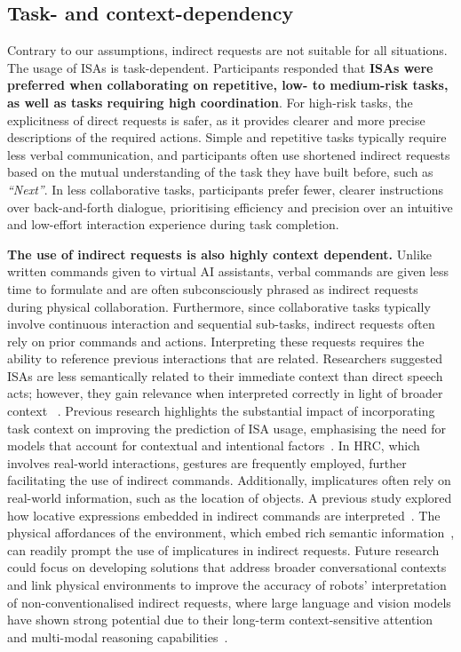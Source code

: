 \subsection{Task- and context-dependency}
Contrary to our assumptions, indirect requests are not suitable for all situations. The usage of ISAs is task-dependent. Participants responded that \textbf{ISAs were preferred when collaborating on repetitive, low- to medium-risk tasks, as well as tasks requiring high coordination}. For high-risk tasks, the explicitness of direct requests is safer, as it provides clearer and more precise descriptions of the required actions. Simple and repetitive tasks typically require less verbal communication, and participants often use shortened indirect requests based on the mutual understanding of the task they have built before, such as \textit{``Next''}. In less collaborative tasks, participants prefer fewer, clearer instructions over back-and-forth dialogue, prioritising efficiency and precision over an intuitive and low-effort interaction experience during task completion.

\textbf{The use of indirect requests is also highly context dependent.} Unlike written commands given to virtual AI assistants, verbal commands are given less time to formulate and are often subconsciously phrased as indirect requests during physical collaboration. Furthermore, since collaborative tasks typically involve continuous interaction and sequential sub-tasks, indirect requests often rely on prior commands and actions. Interpreting these requests requires the ability to reference previous interactions that are related. Researchers suggested ISAs are less semantically related to their immediate context than direct speech acts; however, they gain relevance when interpreted correctly in light of broader context ~\cite{boux2023cognitive}. Previous research highlights the substantial impact of incorporating task context on improving the prediction of ISA usage, emphasising the need for models that account for contextual and intentional factors~\cite{smith2022leveraging}. In HRC, which involves real-world interactions, gestures are frequently employed, further facilitating the use of indirect commands. Additionally, implicatures often rely on real-world information, such as the location of objects. A previous study explored how locative expressions embedded in indirect commands are interpreted~\cite{lamm2017pragmatics}. The physical affordances of the environment, which embed rich semantic information~\cite{gao2024physically, brohan2023can}, can readily prompt the use of implicatures in indirect requests. Future research could focus on developing solutions that address broader conversational contexts and link physical environments to improve the accuracy of robots' interpretation of non-conventionalised indirect requests, where large language and vision models have shown strong potential due to their long-term context-sensitive attention and multi-modal reasoning capabilities~\cite{zhong2024memorybank, sermanet2024robovqa}.
\vspace{-0.5em}

